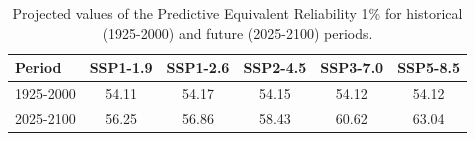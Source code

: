 \begin{table}[htbp]
\centering
\begin{tabular}{lccccc}
\toprule
Period & \textbf{SSP1-1.9} & \textbf{SSP1-2.6} & \textbf{SSP2-4.5} & \textbf{SSP3-7.0} & \textbf{SSP5-8.5} \\
\midrule
1925-2000 & 54.11 & 54.17 & 54.15 & 54.12 & 54.12 \\
2025-2100 & 56.25 & 56.86 & 58.43 & 60.62 & 63.04 \\
\bottomrule
\end{tabular}
\caption{Projected values of the Predictive Equivalent Reliability 1\% for historical (1925-2000) and future (2025-2100) periods.}
\label{tab:pred_scenarios_100per}
\end{table}